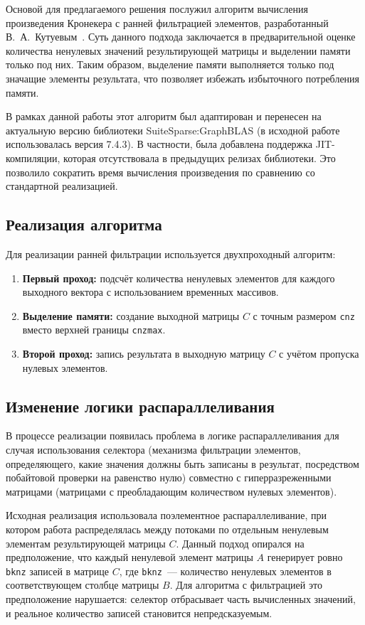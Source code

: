 \documentclass[a4paper]{article}
\begin{document}
Основой для предлагаемого решения послужил алгоритм вычисления произведения Кронекера с ранней фильтрацией элементов, разработанный В.~А.~Кутуевым~\cite{kutuev2023}. Суть данного подхода заключается в предварительной оценке количества ненулевых значений результирующей матрицы и выделении памяти только под них. Таким образом, выделение памяти выполняется только под значащие элементы результата, что позволяет избежать избыточного потребления памяти.

В рамках данной работы этот алгоритм был адаптирован и перенесен на актуальную версию библиотеки SuiteSparse:GraphBLAS (в исходной работе использовалась версия 7.4.3). В частности, была добавлена поддержка JIT-компиляции, которая отсутствовала в предыдущих релизах библиотеки. Это позволило сократить время вычисления произведения по сравнению со стандартной реализацией.

\subsection{Реализация алгоритма}

Для реализации ранней фильтрации используется двухпроходный алгоритм:
\begin{enumerate}
    \item \textbf{Первый проход:} подсчёт количества ненулевых элементов для каждого выходного вектора с использованием временных массивов.
    \item \textbf{Выделение памяти:} создание выходной матрицы $C$ с точным размером \texttt{cnz} вместо верхней границы \texttt{cnzmax}.
    \item \textbf{Второй проход:} запись результата в выходную матрицу $C$ с учётом пропуска нулевых элементов.
\end{enumerate}

\subsection{Изменение логики распараллеливания}

В процессе реализации появилась проблема в логике распараллеливания для случая использования селектора (механизма фильтрации элементов, определяющего, какие значения должны быть записаны в результат, посредством побайтовой проверки на равенство нулю) совместно с гиперразреженными матрицами (матрицами с преобладающим количеством нулевых элементов). 

Исходная реализация использовала поэлементное распараллеливание, при котором работа распределялась между потоками по отдельным ненулевым элементам результирующей матрицы $C$. Данный подход опирался на предположение, что каждый ненулевой элемент матрицы $A$ генерирует ровно \texttt{bknz} записей в матрице $C$, где \texttt{bknz}~--- количество ненулевых элементов в соответствующем столбце матрицы $B$. Для алгоритма с фильтрацией это предположение нарушается: селектор отбрасывает часть вычисленных значений, и реальное количество записей становится непредсказуемым. 
\end{document}
